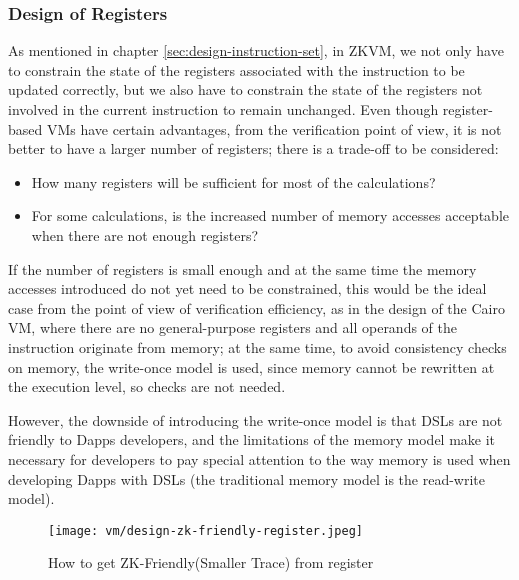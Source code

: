 \subsubsection{Design of Registers} \label{sec:design-registers}

As mentioned in chapter \ref*{sec:design-instruction-set}, in ZKVM, we not only have to constrain the state of the registers associated with
the instruction to be updated correctly, but we also have to constrain the state of the registers not involved in the current
instruction to remain unchanged. Even though register-based VMs have certain advantages, from the verification point of view,
it is not better to have a larger number of registers; there is a trade-off to be considered:

\begin{itemize}
    \item How many registers will be sufficient for most of the calculations?
    \item For some calculations, is the increased number of memory accesses acceptable when there are not enough registers?
\end{itemize}

If the number of registers is small enough and at the same time the memory accesses introduced do not yet need to be constrained,
this would be the ideal case from the point of view of verification efficiency, as in the design of the Cairo VM, where there are
no general-purpose registers and all operands of the instruction originate from memory; at the same time, to avoid consistency checks
on memory, the write-once model is used, since memory cannot be rewritten at the execution level, so checks are not needed.

However, the downside of introducing the write-once model is that DSLs are not friendly to Dapps developers, and the limitations of
the memory model make it necessary for developers to pay special attention to the way memory is used when developing Dapps with DSLs
(the traditional memory model is the read-write model).

\begin{figure}[!ht]
    \centering
    \texttt{[image: vm/design-zk-friendly-register.jpeg]}
    \caption{How to get ZK-Friendly(Smaller Trace) from register}
    \label{fig:design-zk-friendly-register}
\end{figure}

